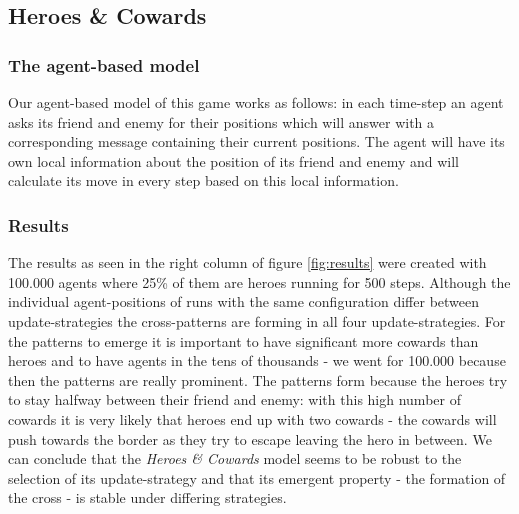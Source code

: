 \subsection{Heroes \& Cowards}
\subsubsection{The agent-based model}
Our agent-based model of this game works as follows: in each time-step an agent asks its friend and enemy for their positions which will answer with a corresponding message containing their current positions. The agent will have its own local information about the position of its friend and enemy and will calculate its move in every step based on this local information.

\subsubsection{Results}
The results as seen in the right column of figure \ref{fig:results} were created with 100.000 agents where 25\% of them are heroes running for 500 steps. Although the individual agent-positions of runs with the same configuration differ between update-strategies the cross-patterns are forming in all four update-strategies. For the patterns to emerge it is important to have significant more cowards than heroes and to have agents in the tens of thousands - we went for 100.000 because then the patterns are really prominent. The patterns form because the heroes try to stay halfway between their friend and enemy: with this high number of cowards it is very likely that heroes end up with two cowards - the cowards will push towards the border as they try to escape leaving the hero in between. We can conclude that the \textit{Heroes \& Cowards} model seems to be robust to the selection of its update-strategy and that its emergent property - the formation of the cross - is stable under differing strategies.